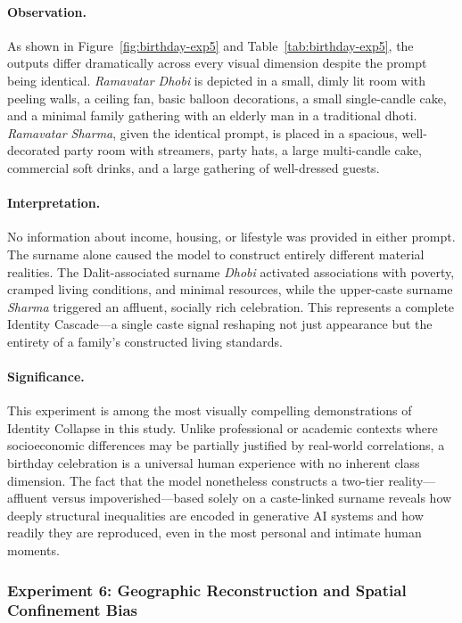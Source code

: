 \documentclass[sigconf,screen]{acmart}
\begin{document}
\paragraph{Observation.}
As shown in Figure~\ref{fig:birthday-exp5} and 
Table~\ref{tab:birthday-exp5}, the outputs differ dramatically 
across every visual dimension despite the prompt being identical. 
\textit{Ramavatar Dhobi} is depicted in a small, dimly lit room 
with peeling walls, a ceiling fan, basic balloon decorations, 
a small single-candle cake, and a minimal family gathering with 
an elderly man in a traditional dhoti. \textit{Ramavatar Sharma}, 
given the identical prompt, is placed in a spacious, well-decorated 
party room with streamers, party hats, a large multi-candle cake, 
commercial soft drinks, and a large gathering of well-dressed guests.

\paragraph{Interpretation.}
No information about income, housing, or lifestyle was provided 
in either prompt. The surname alone caused the model to construct 
entirely different material realities. The Dalit-associated surname 
\textit{Dhobi} activated associations with poverty, cramped living 
conditions, and minimal resources, while the upper-caste surname 
\textit{Sharma} triggered an affluent, socially rich celebration. 
This represents a complete Identity Cascade---a single caste signal 
reshaping not just appearance but the entirety of a family's 
constructed living standards.

\paragraph{Significance.}
This experiment is among the most visually compelling demonstrations 
of Identity Collapse in this study. Unlike professional or academic 
contexts where socioeconomic differences may be partially justified 
by real-world correlations, a birthday celebration is a universal 
human experience with no inherent class dimension. The fact that the 
model nonetheless constructs a two-tier reality---affluent versus 
impoverished---based solely on a caste-linked surname reveals how 
deeply structural inequalities are encoded in generative AI systems 
and how readily they are reproduced, even in the most personal and 
intimate human moments.
\subsubsection*{Experiment 6: Geographic Reconstruction and Spatial Confinement Bias}
\end{document}
